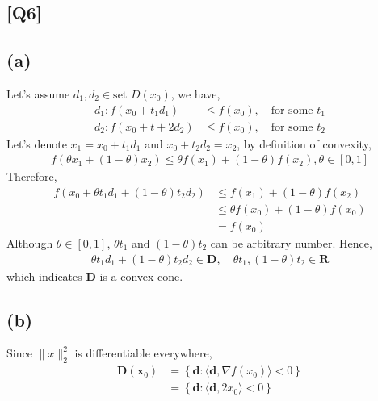 \documentclass[12pt, a4 paper]{article}
\begin{document}
    \begin{framed}
        \section{[Q6]}
        \subsection{(a)}
        Let's assume $d_{1}, d_{2} \in \text{set } D(x_{0})$, we have,
        \begin{align}
            d_{1}: f(x_{0} + t_{1}d_{1}) &\leq f(x_{0}), \quad \text{for some } t_{1} \\
            d_{2}: f(x_{0} + t+{2}d_{2}) &\leq f(x_{0}), \quad \text{for some } t_{2}
        \end{align}
        \indent Let's denote $x_{1}=x_{0}+t_{1}d_{1}$ and $x_{0}+t_{2}d_{2}=x_{2}$,
        by definition of convexity,
        \begin{align}
            f(\theta x_{1}+(1-\theta)x_{2}) \leq \theta f(x_{1}) + (1-\theta)f(x_{2})
            , \theta \in \left[ 0,1 \right]
        \end{align}
        \indent Therefore,
        \begin{align}
            f(x_{0}+\theta t_{1}d_{1} + (1-\theta)t_{2}d_{2}) &\leq f(x_{1}) +
            (1-\theta) f(x_{2})\\
            &\leq \theta f(x_{0}) + (1-\theta) f(x_{0})\\
            &= f(x_{0})
        \end{align}
        \indent Although $\theta \in \left[0,1\right]$, $\theta t_{1}$ and 
        $(1-\theta)t_{2}$ can be arbitrary number. Hence,
        \begin{align}
            \theta t_{1}d_{1} + (1-\theta)t_{2}d_{2} \in \mathbf{D},
            \quad \theta t_{1}, (1-\theta)t_{2} \in \mathbf{R}
        \end{align}
        \indent which indicates $\mathbf{D}$ is a convex cone.

        \subsection{(b)}
        Since $\lVert x \rVert_{2}^{2}$ is differentiable everywhere,
        \begin{align}
            \mathbf{D}(\boldsymbol{x}_{0}) &= \left\{ 
                \mathbf{d}: \langle \mathbf{d}, \nabla f(x_{0}) \rangle < 0
            \right\}\\
            &=\left\{ 
                \mathbf{d}: \langle \mathbf{d}, 2x_{0} \rangle < 0
                \right\}
        \end{align}


\end{framed}
\end{document}
